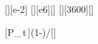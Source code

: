 [\percent][e-2]
[\mega\watt][e6][\watt]
[\hour][3600][\second]

[P_\,t\,]{\PelX*\tSX*(1-\etKX)/\etKX}[\joule]
